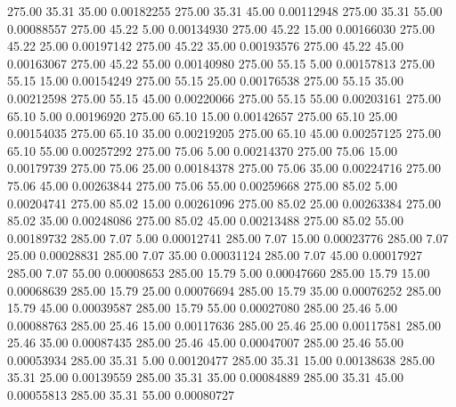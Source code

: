     275.00     35.31     35.00     0.00182255
    275.00     35.31     45.00     0.00112948
    275.00     35.31     55.00     0.00088557
    275.00     45.22      5.00     0.00134930
    275.00     45.22     15.00     0.00166030
    275.00     45.22     25.00     0.00197142
    275.00     45.22     35.00     0.00193576
    275.00     45.22     45.00     0.00163067
    275.00     45.22     55.00     0.00140980
    275.00     55.15      5.00     0.00157813
    275.00     55.15     15.00     0.00154249
    275.00     55.15     25.00     0.00176538
    275.00     55.15     35.00     0.00212598
    275.00     55.15     45.00     0.00220066
    275.00     55.15     55.00     0.00203161
    275.00     65.10      5.00     0.00196920
    275.00     65.10     15.00     0.00142657
    275.00     65.10     25.00     0.00154035
    275.00     65.10     35.00     0.00219205
    275.00     65.10     45.00     0.00257125
    275.00     65.10     55.00     0.00257292
    275.00     75.06      5.00     0.00214370
    275.00     75.06     15.00     0.00179739
    275.00     75.06     25.00     0.00184378
    275.00     75.06     35.00     0.00224716
    275.00     75.06     45.00     0.00263844
    275.00     75.06     55.00     0.00259668
    275.00     85.02      5.00     0.00204741
    275.00     85.02     15.00     0.00261096
    275.00     85.02     25.00     0.00263384
    275.00     85.02     35.00     0.00248086
    275.00     85.02     45.00     0.00213488
    275.00     85.02     55.00     0.00189732
    285.00      7.07      5.00     0.00012741
    285.00      7.07     15.00     0.00023776
    285.00      7.07     25.00     0.00028831
    285.00      7.07     35.00     0.00031124
    285.00      7.07     45.00     0.00017927
    285.00      7.07     55.00     0.00008653
    285.00     15.79      5.00     0.00047660
    285.00     15.79     15.00     0.00068639
    285.00     15.79     25.00     0.00076694
    285.00     15.79     35.00     0.00076252
    285.00     15.79     45.00     0.00039587
    285.00     15.79     55.00     0.00027080
    285.00     25.46      5.00     0.00088763
    285.00     25.46     15.00     0.00117636
    285.00     25.46     25.00     0.00117581
    285.00     25.46     35.00     0.00087435
    285.00     25.46     45.00     0.00047007
    285.00     25.46     55.00     0.00053934
    285.00     35.31      5.00     0.00120477
    285.00     35.31     15.00     0.00138638
    285.00     35.31     25.00     0.00139559
    285.00     35.31     35.00     0.00084889
    285.00     35.31     45.00     0.00055813
    285.00     35.31     55.00     0.00080727

